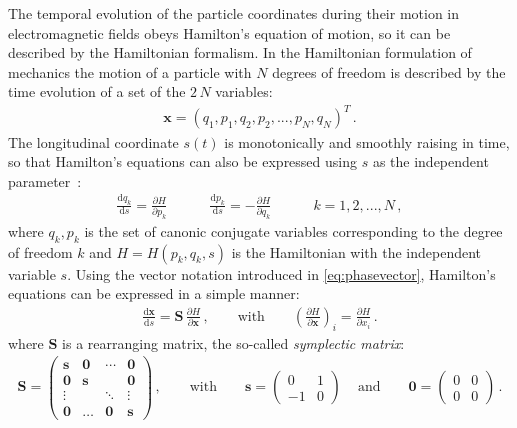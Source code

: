 The temporal evolution of the particle coordinates during their motion in electromagnetic fields obeys Hamilton's equation of motion, so it can be described by the Hamiltonian formalism. In the Hamiltonian formulation of mechanics the motion of a particle with $N$ degrees of freedom is described by the time evolution of a set of the $2\,N$ variables:
\begin{align}
\mathbf{x} = (q_1,p_1,q_2,p_2,...,p_N,q_N)^T \, . \label{eq:phasevector}
\end{align}
The longitudinal coordinate $s(t)$ is monotonically and smoothly raising in time, so that Hamilton's equations can also be expressed using $s$ as the independent parameter~\cite{feynmanlectures,rees_symplecticity}:
%
\begin{align}
\frac{\mathrm{d} q_k}{\mathrm{d}s} = \frac{\partial H}{\partial p_k} \quad \quad \quad \frac{\mathrm{d} p_k}{\mathrm{d}s} = -\frac{\partial H}{\partial q_k} \quad \quad \quad k=1,2,...,N\, , \label{eq:hamiltons}
\end{align}
%
where $q_k,p_k$ is the set of canonic conjugate variables corresponding to the degree of freedom $k$ and $H=H(p_k,q_k,s)$ is the Hamiltonian with the independent variable $s$. Using the vector notation introduced in \eqref{eq:phasevector}, Hamilton's equations can be expressed in a simple manner:
%
\begin{align}
\frac{\mathrm{d} \mathbf{x}}{\mathrm{d}s} = \mathbf{S} \, \frac{\partial H}{\partial \mathbf{x}} \, , \quad \quad \text{with} \quad \quad \left( \frac{\partial H}{\partial \mathbf{x}} \right)_i = \frac{\partial H}{\partial x_i} \, . \label{eq:symplecticform}
\end{align}
%
where $\mathbf{S}$ is a rearranging matrix, the so-called \emph{symplectic matrix}:
\begin{align}
\mathbf{S}
=
\begin{pmatrix}
\mathbf{s} & \mathbf{0}  & \cdots  & \mathbf{0} \\ 
\mathbf{0} & \mathbf{s} &  & \mathbf{0} \\ 
\vdots &  & \ddots  & \vdots \\ 
\mathbf{0} & \hdots & \mathbf{0} & \mathbf{s}
\end{pmatrix} \, ,
 \quad \quad \text{with} \quad \quad \mathbf{s} = 
 \begin{pmatrix}
0 & 1\\ 
-1 &  0
\end{pmatrix} \, \quad \text{and}
 \quad \quad \mathbf{0} = 
 \begin{pmatrix}
0 &  0\\ 
0 &  0
\end{pmatrix} \, .
\end{align}
